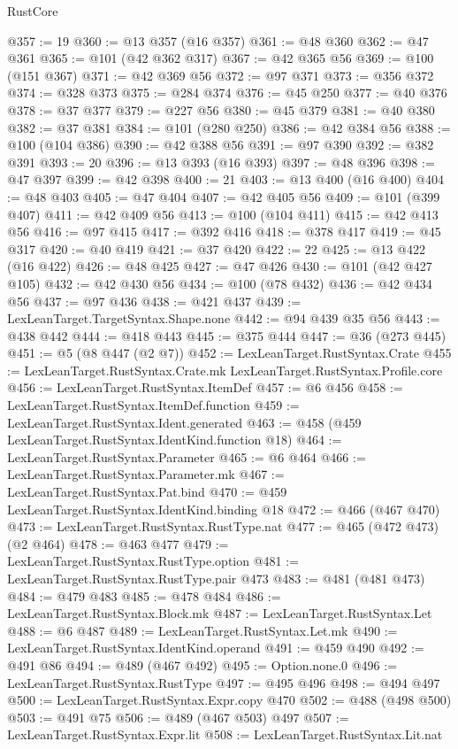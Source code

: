 \begin{lexlean}{RustCore}
\begin{coremodule}
@357 := 19
@360 := @13 @357 (@16 @357)
@361 := @48 @360
@362 := @47 @361
@365 := @101 (@42 @362 @317)
@367 := @42 @365 @56
@369 := @100 (@151 @367)
@371 := @42 @369 @56
@372 := @97 @371
@373 := @356 @372
@374 := @328 @373
@375 := @284 @374
@376 := @45 @250
@377 := @40 @376
@378 := @37 @377
@379 := @227 @56
@380 := @45 @379
@381 := @40 @380
@382 := @37 @381
@384 := @101 (@280 @250)
@386 := @42 @384 @56
@388 := @100 (@104 @386)
@390 := @42 @388 @56
@391 := @97 @390
@392 := @382 @391
@393 := 20
@396 := @13 @393 (@16 @393)
@397 := @48 @396
@398 := @47 @397
@399 := @42 @398
@400 := 21
@403 := @13 @400 (@16 @400)
@404 := @48 @403
@405 := @47 @404
@407 := @42 @405 @56
@409 := @101 (@399 @407)
@411 := @42 @409 @56
@413 := @100 (@104 @411)
@415 := @42 @413 @56
@416 := @97 @415
@417 := @392 @416
@418 := @378 @417
@419 := @45 @317
@420 := @40 @419
@421 := @37 @420
@422 := 22
@425 := @13 @422 (@16 @422)
@426 := @48 @425
@427 := @47 @426
@430 := @101 (@42 @427 @105)
@432 := @42 @430 @56
@434 := @100 (@78 @432)
@436 := @42 @434 @56
@437 := @97 @436
@438 := @421 @437
@439 := LexLeanTarget.TargetSyntax.Shape.none
@442 := @94 @439 @35 @56
@443 := @438 @442
@444 := @418 @443
@445 := @375 @444
@447 := @36 (@273 @445)
@451 := @5 (@8 @447 (@2 @7))
@452 := LexLeanTarget.RustSyntax.Crate
@455 := LexLeanTarget.RustSyntax.Crate.mk LexLeanTarget.RustSyntax.Profile.core
@456 := LexLeanTarget.RustSyntax.ItemDef
@457 := @6 @456
@458 := LexLeanTarget.RustSyntax.ItemDef.function
@459 := LexLeanTarget.RustSyntax.Ident.generated
@463 := @458 (@459 LexLeanTarget.RustSyntax.IdentKind.function @18)
@464 := LexLeanTarget.RustSyntax.Parameter
@465 := @6 @464
@466 := LexLeanTarget.RustSyntax.Parameter.mk
@467 := LexLeanTarget.RustSyntax.Pat.bind
@470 := @459 LexLeanTarget.RustSyntax.IdentKind.binding @18
@472 := @466 (@467 @470)
@473 := LexLeanTarget.RustSyntax.RustType.nat
@477 := @465 (@472 @473) (@2 @464)
@478 := @463 @477
@479 := LexLeanTarget.RustSyntax.RustType.option
@481 := LexLeanTarget.RustSyntax.RustType.pair @473
@483 := @481 (@481 @473)
@484 := @479 @483
@485 := @478 @484
@486 := LexLeanTarget.RustSyntax.Block.mk
@487 := LexLeanTarget.RustSyntax.Let
@488 := @6 @487
@489 := LexLeanTarget.RustSyntax.Let.mk
@490 := LexLeanTarget.RustSyntax.IdentKind.operand
@491 := @459 @490
@492 := @491 @86
@494 := @489 (@467 @492)
@495 := Option.none.{0}
@496 := LexLeanTarget.RustSyntax.RustType
@497 := @495 @496
@498 := @494 @497
@500 := LexLeanTarget.RustSyntax.Expr.copy @470
@502 := @488 (@498 @500)
@503 := @491 @75
@506 := @489 (@467 @503) @497
@507 := LexLeanTarget.RustSyntax.Expr.lit
@508 := LexLeanTarget.RustSyntax.Lit.nat

\end{coremodule}
\end{lexlean}
